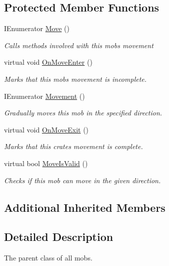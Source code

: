 \subsection*{Protected Member Functions}
\begin{DoxyCompactItemize}
\item 
I\+Enumerator \mbox{\hyperlink{class_mob_aca6588515e7a5daa0e1c8f274c37e46f}{Move}} ()
\begin{DoxyCompactList}\small\item\em Calls methods involved with this mob\textquotesingle{}s movement \end{DoxyCompactList}\item 
virtual void \mbox{\hyperlink{class_mob_afe18435e81a113484d2b38a6c91eba1a}{On\+Move\+Enter}} ()
\begin{DoxyCompactList}\small\item\em Marks that this mob\textquotesingle{}s movement is incomplete. \end{DoxyCompactList}\item 
I\+Enumerator \mbox{\hyperlink{class_mob_a3eb78b08b3605ddc4b37395b18437c7d}{Movement}} ()
\begin{DoxyCompactList}\small\item\em Gradually moves this mob in the specified direction. \end{DoxyCompactList}\item 
virtual void \mbox{\hyperlink{class_mob_aa523ff737b0324ec092670280d528c58}{On\+Move\+Exit}} ()
\begin{DoxyCompactList}\small\item\em Marks that this crate\textquotesingle{}s movement is complete. \end{DoxyCompactList}\item 
virtual bool \mbox{\hyperlink{class_mob_a9f08167514165ff0aa3683091db87133}{Move\+Is\+Valid}} ()
\begin{DoxyCompactList}\small\item\em Checks if this mob can move in the given direction. \end{DoxyCompactList}\end{DoxyCompactItemize}
\subsection*{Additional Inherited Members}


\subsection{Detailed Description}
The parent class of all mobs. 

